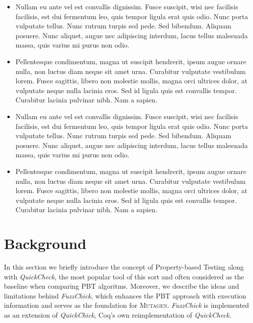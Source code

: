 \documentclass[acmsmall, anonymous]{acmart}
\newcommand{\quickcheck}{\textit{QuickCheck}\xspace}
\newcommand{\quickchick}{\textit{QuickChick}\xspace}
\newcommand{\fuzzchick}{\textit{FuzzChick}\xspace}
\newcommand{\mutagen}{\textsc{Mutagen}\xspace}
\begin{document}
\begin{itemize}
\item Nullam eu ante vel est convallis dignissim. Fusce suscipit, wisi nec
  facilisis facilisis, est dui fermentum leo, quis tempor ligula erat quis odio.
  Nunc porta vulputate tellus. Nunc rutrum turpis sed pede. Sed bibendum.
  Aliquam posuere. Nunc aliquet, augue nec adipiscing interdum, lacus tellus
  malesuada massa, quis varius mi purus non odio.
\item Pellentesque condimentum,
  magna ut suscipit hendrerit, ipsum augue ornare nulla, non luctus diam neque
  sit amet urna. Curabitur vulputate vestibulum lorem. Fusce sagittis, libero
  non molestie mollis, magna orci ultrices dolor, at vulputate neque nulla
  lacinia eros. Sed id ligula quis est convallis tempor. Curabitur lacinia
  pulvinar nibh. Nam a sapien.
\item Nullam eu ante vel est convallis dignissim. Fusce suscipit, wisi nec
  facilisis facilisis, est dui fermentum leo, quis tempor ligula erat quis odio.
  Nunc porta vulputate tellus. Nunc rutrum turpis sed pede. Sed bibendum.
  Aliquam posuere. Nunc aliquet, augue nec adipiscing interdum, lacus tellus
  malesuada massa, quis varius mi purus non odio.
\item Pellentesque condimentum, magna ut suscipit hendrerit, ipsum augue ornare
  nulla, non luctus diam neque sit amet urna. Curabitur vulputate vestibulum
  lorem. Fusce sagittis, libero non molestie mollis, magna orci ultrices dolor,
  at vulputate neque nulla lacinia eros. Sed id ligula quis est convallis
  tempor. Curabitur lacinia pulvinar nibh. Nam a sapien.
\end{itemize}


\section{Background}
\label{sec:background}

In this section we briefly introduce the concept of Property-based Testing along
with \quickcheck, the most popular tool of this sort and often considered as the
baseline when comparing PBT algoritms.
%
Moreover, we describe the ideas and limitations behind \fuzzchick, which
enhances the PBT approach with execution information and serves as the
foundation for \mutagen.
%
\fuzzchick is implemented as an extension of \quickchick, Coq's own
reimplementation of \quickcheck.
\end{document}
